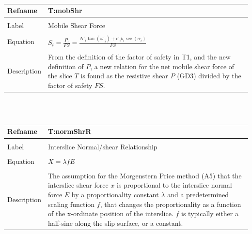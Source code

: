 \documentclass[12pt]{article}
\begin{document}
~\newline
\noindent \begin{minipage}{\textwidth}
\begin{tabular}{p{} p{}}
\toprule \textbf{Refname} & \textbf{T:mobShr}
\label{T:mobShr}
\\ \midrule \\
Label & Mobile Shear Force
\\ \midrule \\
Equation & $S_{i}=\frac{P_{i}}{FS}=\frac{{N'}_{i} \tan\left({\varphi{}'}_{i}\right)+{c'}_{i} b_{i} \sec\left(\alpha{}_{i}\right)}{FS}$
\\ \midrule \\
Description & From the definition of the factor of safety in T1, and the new definition of $P$, a new relation for the net mobile shear force of the slice $T$ is found as the resistive shear $P$ (GD3) divided by the factor of safety $FS$.
\\ \bottomrule \end{tabular}
\end{minipage}\\
~\newline
\noindent \begin{minipage}{\textwidth}
\begin{tabular}{p{} p{}}
\toprule \textbf{Refname} & \textbf{T:normShrR}
\label{T:normShrR}
\\ \midrule \\
Label & Interslice Normal/shear Relationship
\\ \midrule \\
Equation & $X=\lambda{} f E$
\\ \midrule \\
Description & The assumption for the Morgenstern Price method (A5) that the interslice shear force $x$ is proportional to the interslice normal force $E$ by a proportionality constant $\lambda{}$ and a predetermined scaling function $f$, that changes the proportionality as a function of the x-ordinate position of the interslice. $f$ is typically either a half-sine along the slip surface, or a constant.
\\ \bottomrule \end{tabular}
\end{minipage}\\
~\newline
\end{document}
